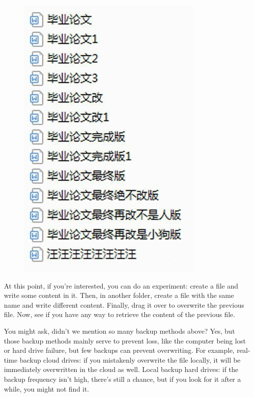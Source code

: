 \begin{minipage}[t]{0.34\textwidth}
    \begin{figure}[H]
        \includegraphics[width=0.95\columnwidth, right]{author-folder/Kai.Wu/thesis_versions.jpg}
    \end{figure}
\end{minipage}

At this point, if you're interested, you can do an experiment: create a file and write some content in it. Then, in another folder, create a file with the same name and write different content. Finally, drag it over to overwrite the previous file. Now, see if you have any way to retrieve the content of the previous file.

You might ask, didn't we mention so many backup methods above? Yes, but those backup methods mainly serve to prevent loss, like the computer being lost or hard drive failure, but few backups can prevent overwriting. For example, real-time backup cloud drives: if you mistakenly overwrite the file locally, it will be immediately overwritten in the cloud as well. Local backup hard drives: if the backup frequency isn't high, there's still a chance, but if you look for it after a while, you might not find it.

